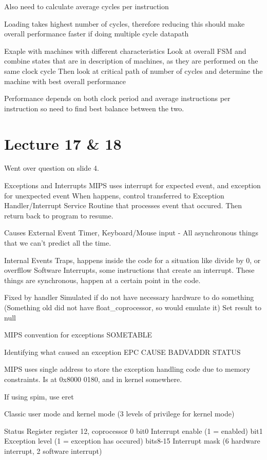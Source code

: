 \documentclass{article}
\begin{document}
	Also need to calculate average cycles per instruction

	Loading takes highest number of cycles, therefore reducing this should make overall performance faster if doing multiple cycle datapath

	Exaple with machines with different characteristics
		Look at overall FSM and combine states that are in description of machines, as they are performed on the same clock cycle
		Then look at critical path of number of cycles and determine the machine with best overall performance 

	Performance depends on both clock period and average instructions per instruction so need to find best balance between the two.

\section{Lecture 17 \& 18}
	Went over question on slide 4.

	Exceptions and Interrupts
		MIPS uses interrupt for expected event, and exception for unexpected event
		When happens, control transferred to Exception Handler/Interrupt Service Routine that processes event that occured.
		Then return back to program to resume.

		Causes
			External Event
				Timer, Keyboard/Mouse input - All asynchronous things that we can't predict all the time.

			Internal Events
				Traps, happens inside the code for a situation like divide by 0, or overfllow
				Software Interrupts, some instructions that create an interrupt.
				These things are synchronous, happen at a certain point in the code.

				Fixed by handler
				Simulated if do not have necessary hardware to do something (Something old did not have float\_coprocessor, so would emulate it)
				Set result to null

	MIPS convention for exceptions
		SOMETABLE


	Identifying what caused an exception
		EPC
		CAUSE
		BADVADDR
		STATUS

		MIPS uses single address to store the exception handling code due to memory constraints.
		Is at 0x8000 0180, and in kernel somewhere.

		If using spim, use eret

		Classic user mode and kernel mode (3 levels of privilege for kernel mode)

	Status Register
		register 12, coprocessor 0
		bit0	Interrupt enable (1 = enabled)
		bit1	Exception level (1 = exception has occured)
		bits8-15	Interrupt mask (6 hardware interrupt, 2 software interrupt)
\end{document}
